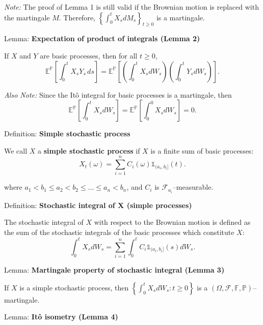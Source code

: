 \documentclass[12pt,a4paper]{article}
\begin{document}
\textit{Note:} The proof of Lemma 1 is still valid if the Brownian motion is replaced with the martingale $M$. Therefore, $\left\{\int_0^t X_s dM_s\right\}_{t \geq 0}$ is a martingale.
\vspace{1em}

Lemma: \textbf{Expectation of product of integrals (Lemma 2)}
\vspace{0.5em}

If $X$ and $Y$ are basic processes, then for all $t \geq 0$,
\[
\mathbb{E}^{\mathbb{P}}\left[\int_0^t X_s Y_s \, ds\right] = \mathbb{E}^{\mathbb{P}}\left[\left(\int_0^t X_s dW_s\right)\left(\int_0^t Y_s dW_s\right)\right].
\]
\vspace{1em}

\textit{Also Note:} Since the Itô integral for basic processes is a martingale, then
\[
\mathbb{E}^{\mathbb{P}}\left[\int_0^t X_s dW_s\right] = \mathbb{E}^{\mathbb{P}}\left[\int_0^0 X_s dW_s\right] = 0.
\]
\vspace{1em}

Definition: \textbf{Simple stochastic process}
\vspace{0.5em}

We call $X$ a \textbf{simple stochastic process} if $X$ is a finite sum of basic processes:
\[
X_t(\omega) = \sum_{i=1}^{n} C_i(\omega)\mathbb{1}_{(a_i, b_i]}(t).
\]

where $a_1 < b_1 \leq a_2 < b_2 \leq \ldots \leq a_n < b_n$, and $C_i$ is $\mathcal{F}_{a_i}$--measurable.
\vspace{1em}

Definition: \textbf{Stochastic integral of X (simple processes)}
\vspace{0.5em}

The stochastic integral of $X$ with respect to the Brownian motion is defined as the sum of the stochastic integrals of the basic processes which constitute $X$:
\[
\int_0^t X_s dW_s = \sum_{i=1}^{n} \int_0^t C_i\mathbb{1}_{(a_i, b_i]}(s) dW_s.
\]
\vspace{1em}

Lemma: \textbf{Martingale property of stochastic integral (Lemma 3)}
\vspace{0.5em}

If $X$ is a simple stochastic process, then $\left\{\int_0^t X_s dW_s : t \geq 0\right\}$ is a $(\Omega, \mathcal{F}, \mathbb{F}, \mathbb{P})$--martingale.
\vspace{1em}

Lemma: \textbf{Itô isometry (Lemma 4)}
\vspace{0.5em}
\end{document}

